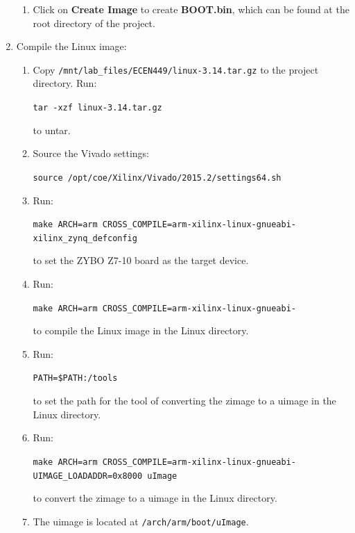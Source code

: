 \documentclass[11pt,letterpaper,titlepage]{article}
\begin{document}
\begin{enumerate}
\begin{enumerate}
        \item Click on \textbf{Create Image} to create \textbf{BOOT.bin}, which can be found at the root directory of the project.
        
    \end{enumerate}
    
    \item Compile the Linux image:
    
    \begin{enumerate}
        
        \item Copy \verb|/mnt/lab_files/ECEN449/linux-3.14.tar.gz| to the project directory. Run:
        
        \verb|tar -xzf linux-3.14.tar.gz|
        
        to untar.
        
        \item Source the Vivado settings:
        
        \verb|source /opt/coe/Xilinx/Vivado/2015.2/settings64.sh|
        
        \item Run:
        
        \verb|make ARCH=arm CROSS_COMPILE=arm-xilinx-linux-gnueabi- xilinx_zynq_defconfig|
        
        to set the ZYBO Z7-10 board as the target device.
        
        \item Run:
        
        \verb|make ARCH=arm CROSS_COMPILE=arm-xilinx-linux-gnueabi-|
        
        to compile the Linux image in the Linux directory.
        
        \item Run:
        
        \verb|PATH=$PATH:/tools|
        
        to set the path for the tool of converting the zimage to a uimage in the Linux directory.
        
        \item Run:
        
        \verb|make ARCH=arm CROSS_COMPILE=arm-xilinx-linux-gnueabi- UIMAGE_LOADADDR=0x8000 uImage|
        
        to convert the zimage to a uimage in the Linux directory.
        
        \item The uimage is located at \verb|/arch/arm/boot/uImage|.
        

\end{enumerate}
\end{enumerate}
\end{document}
